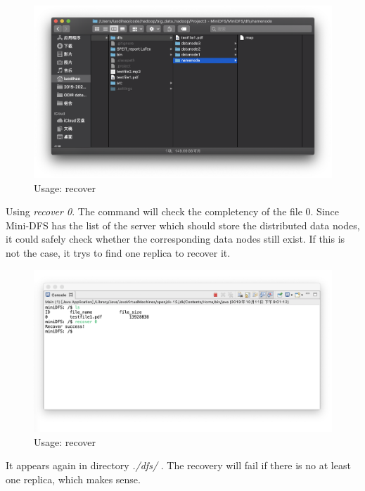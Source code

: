 \documentclass[10pt]{article}
\begin{document}
\begin{figure}[H]
\centerline{\includegraphics[width = 1\textwidth]{screenshot//recover_01.png}}
\caption{Usage: recover}
\end{figure}

Using \textit{recover 0}. The command will check the completency of the file 0. 
Since Mini-DFS has the list of the server which should store the distributed data nodes, 
it could safely check whether the corresponding data nodes still exist. If this is 
not the case, it trys to find one replica to recover it.

\begin{figure}[H]
\centerline{\includegraphics[width = 1\textwidth]{screenshot//recover_02.png}}
\caption{Usage: recover}
\end{figure}

It appears again in directory \textit{./dfs/} . The recovery will fail if there is no at least one replica, which makes sense.
\end{document}
